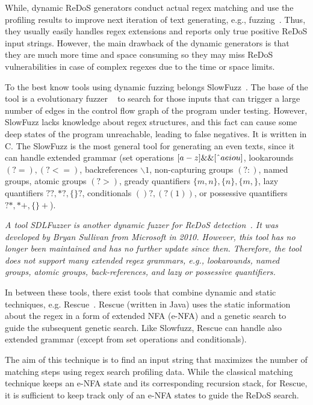 \documentclass[acmsmall,screen]{acmart}
\begin{document}
%
While, dynamic ReDoS generators conduct actual regex matching and
use the profiling results to improve next iteration of text generating, 
e.g., fuzzing~\cite{fuzzing}. 
%
Thus, they usually easily handles regex extensions
and reports only true positive ReDoS input strings. 
%
However, the main drawback of the dynamic generators is that
they are much more time and space consuming so they may
miss ReDoS vulnerabilities in case of complex regexes due
to the time or space limits.
%


To the best know tools using dynamic fuzzing belongs
SlowFuzz~\cite{slowfuzz}.
%
The base of the tool is a evolutionary fuzzer ~\cite{libfuzz}
to search for those inputs that can trigger a
large number of edges in the control flow graph of the program
under testing. 
%
However, SlowFuzz lacks knowledge about regex structures, and this fact can cause some
deep states of the program unreachable, leading to false negatives.
%
It is written in C.
%
The SlowFuzz is the most general tool for generating an even texts, since it can handle extended grammar (set operations $[a-z]\&\&[\string^ aeiou]$, lookarounds $(?=), (?<=)$, backreferences $\backslash1$, non-capturing groups $(?:)$, named groups, atomic groups $(?>)$, gready quantifiers $\{m,n\}, \{n\}, \{m,\}$, lazy quantifiers $??, *?, \{\}?$, conditionals $()?, (?(1))$, or possessive quantifiers $?*, *+, \{\}+$).

\emph{
A tool SDLFuzzer is another dynamic fuzzer for ReDoS detection~\cite{}.
%
It was developed by Bryan Sullivan from Microsoft in 2010. 
%
However, this tool has no longer been maintained and has no further update
since then. 
%
Therefore, the tool does not support many extended
regex grammars, e.g., lookarounds, named groups, atomic groups,
back-references, and lazy or possessive quantifiers.
}



In between these tools, there exist tools that combine dynamic and static techniques,
e.g. Rescue~\cite{rescue}. 
%
Rescue (written in Java) uses the static information about the regex in a form of extended NFA (e-NFA)
and a genetic search to guide the subsequent genetic search. 
%
Like Slowfuzz, Rescue can handle also extended grammar (except from set operations and conditionals).


The aim of this technique is to find an input string that maximizes the
number of matching steps using regex search profiling data.
%
While the classical matching technique keeps an e-NFA state and its corresponding recursion stack,
%
for Rescue, it is sufficient to keep track only of an e-NFA states to guide the ReDoS search.
\end{document}
